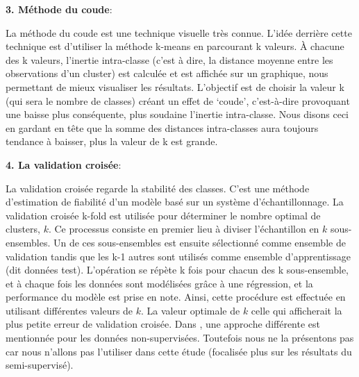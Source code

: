 \documentclass[12pt,a4paper]{book}
\newcommand{\1}{\mathds{1}}
\begin{document}
\begin{description}
\vspace{5 mm}
		\item \textbf{3. Méthode du coude}:
		
  La méthode du coude est une technique visuelle très connue. L’idée derrière cette technique est d’utiliser la méthode k-means en parcourant k valeurs. À chacune des k valeurs, l'inertie intra-classe (c'est à dire, la distance moyenne entre les observations d'un cluster) est calculée et est affichée sur un graphique, nous permettant de mieux visualiser les résultats. L’objectif est de choisir la valeur k (qui sera le nombre de classes) créant un effet de ‘coude’, c’est-à-dire provoquant une baisse plus conséquente, plus soudaine l'inertie intra-classe. Nous disons ceci en gardant en tête que la somme des distances intra-classes aura toujours tendance à baisser, plus la valeur de k est grande. 

\vspace{5 mm}
 	 \item \textbf{4. La validation croisée}:
 	 
La validation croisée regarde la stabilité des classes. C'est une méthode d’estimation de fiabilité d’un modèle basé sur un système d'échantillonnage. La validation croisée k-fold est utilisée pour déterminer le nombre optimal de clusters, $k$. Ce processus consiste en premier lieu à diviser l’échantillon en $k$ sous-ensembles. Un de ces sous-ensembles est ensuite sélectionné comme ensemble de validation tandis que les k-1 autres sont utilisés comme ensemble d'apprentissage (dit données test). L’opération se répète k fois pour chacun des k sous-ensemble, et à chaque fois les données sont modélisées grâce à une régression, et la performance du modèle est prise en note. Ainsi, cette procédure est effectuée en utilisant différentes valeurs de $k$. La valeur optimale de $k$ celle qui afficherait la plus petite erreur de validation croisée. Dans \cite{WPO2017}, une approche différente est mentionnée pour les données non-supervisées. Toutefois nous ne la présentons pas car nous n'allons pas l'utiliser dans cette étude (focalisée plus sur les résultats du semi-supervisé). 
 	 
\end{description}
\end{document}
